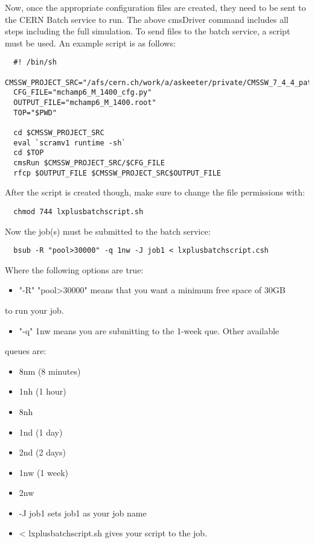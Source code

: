 \documentclass[11 pt , letterpaper , twoside , openright]{book}
\begin{document}
\begin{enumerate}
\begin{enumerate}
Now, once the appropriate configuration files are created, they
need to be sent to the CERN Batch service to run. The above
cmsDriver command includes all steps including the full
simulation. To send files to the batch service, a script must be
used. An example script is as follows:

\lstset{language=sh,label=batch-script-example,caption= ,numbers=none}
\begin{lstlisting}
  #! /bin/sh
  CMSSW_PROJECT_SRC="/afs/cern.ch/work/a/askeeter/private/CMSSW_7_4_4_patch4/src/"
  CFG_FILE="mchamp6_M_1400_cfg.py"
  OUTPUT_FILE="mchamp6_M_1400.root"
  TOP="$PWD"

  cd $CMSSW_PROJECT_SRC
  eval `scramv1 runtime -sh`
  cd $TOP
  cmsRun $CMSSW_PROJECT_SRC/$CFG_FILE
  rfcp $OUTPUT_FILE $CMSSW_PROJECT_SRC$OUTPUT_FILE
\end{lstlisting}

After the script is created though, make sure to change the file
permissions with:
\lstset{language=sh,label= ,caption= ,numbers=none}
\begin{lstlisting}
  chmod 744 lxplusbatchscript.sh
\end{lstlisting}

Now the job(s) must be submitted to the batch service:
\lstset{language=sh,label=batch-sender-example,caption= ,numbers=none}
\begin{lstlisting}
  bsub -R "pool>30000" -q 1nw -J job1 < lxplusbatchscript.csh
\end{lstlisting}
Where the following options are true: 
\begin{itemize}
\item "-R" "pool>30000" means that you want a minimum free space of 30GB
\end{itemize}
to run your job. 
\begin{itemize}
\item "-q" 1nw means you are submitting to the 1-week que. Other available
\end{itemize}
queues are:
\begin{itemize}
\item 8nm (8 minutes)
\item 1nh (1 hour)
\item 8nh
\item 1nd (1 day)
\item 2nd (2 days)
\item 1nw (1 week)
\item 2nw
\item -J job1 sets job1 as your job name
\item < lxplusbatchscript.sh gives your script to the job.
\end{itemize}


\end{enumerate}
\end{enumerate}
\end{document}
